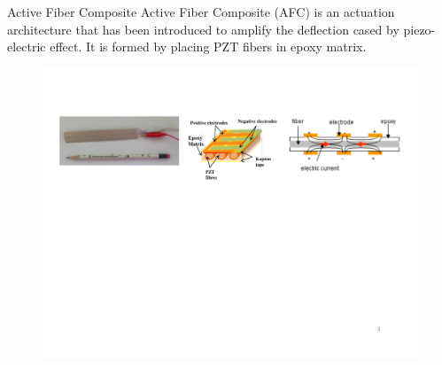\documentclass{beamer}
\begin{document}
\begin{frame}{Active Fiber Composite}
Active Fiber Composite (AFC) is an actuation architecture that has been introduced to amplify the deflection cased by piezo-electric effect.
It is formed by placing PZT fibers in epoxy matrix. 
\begin{figure}
\includegraphics[scale=0.35,trim = 0mm 0mm 0mm 0mm]{../images/active_fiber_composite_pictures.pdf}
\end{figure}
\end{frame} 
\end{document}
